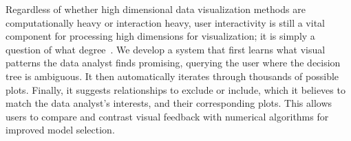 Regardless of whether high dimensional data visualization methods are computationally heavy or interaction heavy, user interactivity is still a vital component for processing high dimensions for visualization; it is simply a question of what degree~\cite{lius2016}. We develop a system that first learns what visual patterns the data analyst finds promising, querying the user where the decision tree is ambiguous. It then automatically iterates through thousands of possible plots. Finally, it suggests relationships to exclude or include, which it believes to match the data analyst's interests, and their corresponding plots. This allows users to compare and contrast visual feedback with numerical algorithms for improved model selection.
